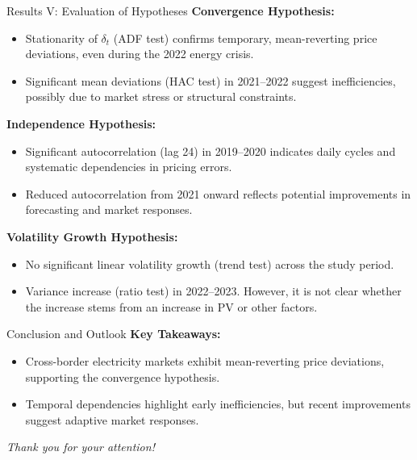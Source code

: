 \documentclass[aspectratio=169,xcolor=dvipsnames]{beamer}
\begin{document}
\begin{frame}{Results V: Evaluation of Hypotheses}
\textbf{Convergence Hypothesis:}
\begin{itemize}
    \item Stationarity of $\delta_t$ (ADF test) confirms temporary, mean-reverting price deviations, even during the 2022 energy crisis.
    \item Significant mean deviations (HAC test) in 2021–2022 suggest inefficiencies, possibly due to market stress or structural constraints.
\end{itemize}

\textbf{Independence Hypothesis:}
\begin{itemize}
    \item Significant autocorrelation (lag 24) in 2019–2020 indicates daily cycles and systematic dependencies in pricing errors.
    \item Reduced autocorrelation from 2021 onward reflects potential improvements in forecasting and market responses.
\end{itemize}

\textbf{Volatility Growth Hypothesis:}
\begin{itemize}
    \item No significant linear volatility growth (trend test) across the study period.
    \item Variance increase (ratio test) in 2022–2023. However, it is not clear whether the increase stems from an increase in PV or other factors. 
\end{itemize}
\end{frame}

\begin{frame}{Conclusion and Outlook}
\textbf{Key Takeaways:}
\begin{itemize}
    \item Cross-border electricity markets exhibit mean-reverting price deviations, supporting the convergence hypothesis.
    \item Temporal dependencies highlight early inefficiencies, but recent improvements suggest adaptive market responses.
\end{itemize}
\vspace{1cm}
\centering
\textit{Thank you for your attention!}
\end{frame}
\end{document}
